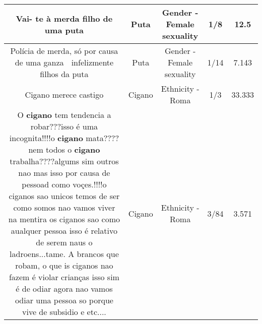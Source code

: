 \documentclass[11pt]{article}
\newlength\mylength
\begin{document}
\begin{center}
\begin{longtable}{|C{.65\mylength}|C{.30\mylength}|C{.12\mylength}|C{.12\mylength}|C{.12\mylength}|}
  \small Vai- te à merda filho de uma puta\normalsize   & Puta & Gender - Female sexuality & 1/8 & 12.5 \\  \hline
  \small Polícia de merda, só por causa de uma ganza 👊 infelizmente filhos da puta\normalsize   & Puta & Gender - Female sexuality & 1/14 & 7.143 \\  \hline
  \small Cigano merece castigo\normalsize   & Cigano & Ethnicity - Roma & 1/3 & 33.333 \\  \hline
  \small O \textbf{cigano} tem tendencia a robar???isso é uma incognita!!!!o \textbf{cigano} mata????nem todos o \textbf{cigano} trabalha????algums sim outros nao mas isso por causa de pessoad como voçes.!!!!o ciganos sao unicos temos de ser como somos nao vamos viver na mentira os ciganos sao como aualquer pessoa isso é relativo de serem naus o ladroens...tame. A brancos que robam, o que is ciganos nao fazem é violar crianças  isso sim é de odiar agora nao vamos odiar uma pessoa so porque vive de subsidio e etc....\normalsize   & Cigano & Ethnicity - Roma & 3/84 & 3.571 \\  \hline

\end{longtable}
\end{center}
\end{document}
